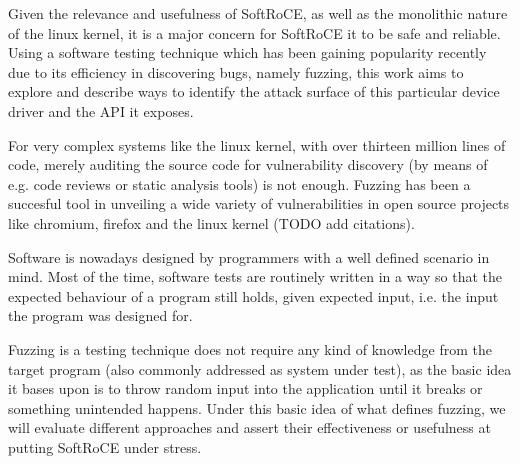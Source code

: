 
Given the relevance and usefulness of SoftRoCE, as well as the monolithic nature of the linux kernel,
it is a major concern for SoftRoCE it to be safe and reliable.
Using a software testing technique which has been gaining popularity recently due to its efficiency in
discovering bugs, namely fuzzing, this work aims to explore and describe ways to identify the attack surface
of this particular device driver and the API it exposes.

For very complex systems like the linux kernel, with over thirteen million lines of code, merely auditing the
source code for vulnerability discovery (by means of e.g. code reviews or static analysis tools) is not enough.
Fuzzing has been a succesful tool in unveiling a wide variety of vulnerabilities in open source projects like chromium,
firefox and the linux kernel (TODO add citations).

Software is nowadays designed by programmers with a well defined scenario in mind. Most of the time, software tests
are routinely written in a way so that the expected behaviour of a program still holds, given expected input, i.e. the input
the program was designed for.

Fuzzing is a testing technique does not require any kind of knowledge from the target program (also commonly addressed as system under test),
as the basic idea it bases upon is to throw random input into the application until it breaks or something unintended happens. Under
this basic idea of what defines fuzzing, we will evaluate different approaches and assert their effectiveness or usefulness
at putting SoftRoCE under stress.
